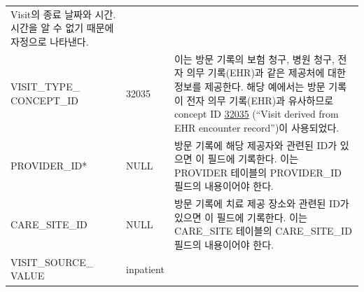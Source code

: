 \documentclass[10.5pt]{book}
\theoremstyle{definition}
\theoremstyle{definition}
\theoremstyle{definition}
\theoremstyle{remark}
\begin{document}
\begin{longtable}[]{@{}lll@{}}
\begin{minipage}[t]{0.48\columnwidth}
Visit의 종료 날짜와 시간. 시간을 알 수 없기 때문에 자정으로
나타낸다.\strut
\end{minipage}\tabularnewline
\begin{minipage}[t]{0.28\columnwidth}\raggedright\strut
VISIT\_TYPE\_ CONCEPT\_ID\strut
\end{minipage} & \begin{minipage}[t]{0.16\columnwidth}\raggedright\strut
32035\strut
\end{minipage} & \begin{minipage}[t]{0.48\columnwidth}\raggedright\strut
이는 방문 기록의 보험 청구, 병원 청구, 전자 의무 기록(EHR)과 같은
제공처에 대한 정보를 제공한다. 해당 예에서는 방문 기록이 전자 의무
기록(EHR)과 유사하므로 concept ID
\href{http://athena.ohdsi.org/search-terms/terms/32035}{32035} (``Visit
derived from EHR encounter record'')이 사용되었다.\strut
\end{minipage}\tabularnewline
\begin{minipage}[t]{0.28\columnwidth}\raggedright\strut
PROVIDER\_ID*\strut
\end{minipage} & \begin{minipage}[t]{0.16\columnwidth}\raggedright\strut
NULL\strut
\end{minipage} & \begin{minipage}[t]{0.48\columnwidth}\raggedright\strut
방문 기록에 해당 제공자와 관련된 ID가 있으면 이 필드에 기록한다. 이는
PROVIDER 테이블의 PROVIDER\_ID 필드의 내용이어야 한다.\strut
\end{minipage}\tabularnewline
\begin{minipage}[t]{0.28\columnwidth}\raggedright\strut
CARE\_SITE\_ID\strut
\end{minipage} & \begin{minipage}[t]{0.16\columnwidth}\raggedright\strut
NULL\strut
\end{minipage} & \begin{minipage}[t]{0.48\columnwidth}\raggedright\strut
방문 기록에 치료 제공 장소와 관련된 ID가 있으면 이 필드에 기록한다. 이는
CARE\_SITE 테이블의 CARE\_SITE\_ID 필드의 내용이어야 한다.\strut
\end{minipage}\tabularnewline
\begin{minipage}[t]{0.28\columnwidth}\raggedright\strut
VISIT\_SOURCE\_ VALUE\strut
\end{minipage} & \begin{minipage}[t]{0.16\columnwidth}\raggedright\strut
inpatient\strut
\end{minipage} & \begin{minipage}[t]{0.48\columnwidth}\raggedright\strut

\end{minipage}
\end{longtable}
\end{document}
